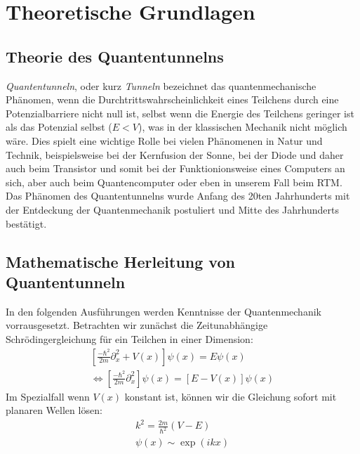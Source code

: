 \section{Theoretische Grundlagen}

\newcommand{\VG}{V_{\mathbf{G}}}
\newcommand{\G}{\mathbf{G}}
\newcommand{\g}{\mathbf{g}}
\newcommand{\R}{\mathbf{r}}
\newcommand{\K}{\mathbf{k}}
\newcommand{\A}{\mathbf{a}}
\newcommand{\ex}{\mathbf{e}^}

\subsection{Theorie des Quantentunnelns}
\textit{Quantentunneln}, oder kurz \textit{Tunneln} 
bezeichnet das quantenmechanische Phänomen, wenn 
die Durchtrittswahrscheinlichkeit eines Teilchens
durch eine Potenzialbarriere nicht null ist, selbst wenn die Energie
des Teilchens geringer ist als das Potenzial selbst ($E < V$), was
in der klassischen Mechanik nicht möglich wäre. Dies
spielt eine wichtige Rolle bei
vielen Phänomenen in Natur und Technik,
beispielsweise bei der Kernfusion der Sonne, bei der Diode und
daher auch beim Transistor und somit bei der Funktionionsweise
eines Computers an sich, aber auch beim Quantencomputer oder
eben in unserem Fall beim RTM. Das Phänomen des Quantentunnelns
wurde Anfang des 20ten Jahrhunderts mit der Entdeckung der 
Quantenmechanik postuliert und Mitte des Jahrhunderts bestätigt.
\subsection{Mathematische Herleitung von Quantentunneln}
In den folgenden Ausführungen werden Kenntnisse der Quantenmechanik
vorrausgesetzt. Betrachten wir zunächst die Zeitunabhängige
Schrödingergleichung für ein Teilchen in einer Dimension:
\begin{align}
\left [ \frac{-\hbar^2}{2m}\partial_x^2 + V(x) \right ]\psi(x) = E\psi(x) \\ 
\Leftrightarrow \left [ \frac{-\hbar^2}{2m}\partial_x^2 \right ]\psi(x) = \left [E-V(x) \right ]\psi(x) 
\end{align}
Im Spezialfall wenn $V(x)$ konstant ist, können wir die Gleichung
sofort mit planaren Wellen lösen:
\begin{align}
    k^2 = \frac{2m}{\hbar^2}(V-E)\\
    \psi(x) \sim \exp(ikx) 
\end{align}
